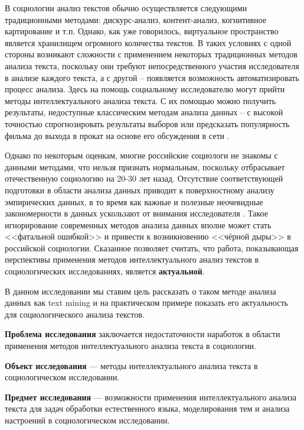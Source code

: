 В социологии анализ текстов обычно осуществляется следующими традиционными методами: дискурс-анализ, контент-анализ, когнитивное картирование и т.п. Однако, как уже говорилось, виртуальное пространство является хранилищем огромного количества текстов. В таких условиях с одной стороны возникают сложности с применением некоторых традиционных методов анализа текста, поскольку они требуют непосредственного участия исследователя в анализе каждого текста, а с другой -- появляется возможность автоматизировать процесс анализа. Здесь на помощь социальному исследователю могут прийти методы интеллектуального анализа текста. С их помощью можно получить результаты, недоступные классическим методам анализа данных --  с высокой точностью спрогнозировать результаты выборов \cite{venezuala} или предсказать популярность фильма до выхода в прокат на основе его обсуждения в сети \cite{hp_predicting}.

Однако по некоторым оценкам, многие российские социологи не знакомы с данными методами, что нельзя признать нормальным, поскольку отбрасывает отечественную социологию на 20-30 лет назад. Отсутствие соответствующей подготовки в области анализа данных приводит к поверхностному анализу эмпирических данных, в то время как важные и полезные неочевидные закономерности в данных ускользают от внимания исследователя \cite{Davydov_Knowledge}. Такое игнорирование современных методов анализа данных вполне может стать <<фатальной ошибкой>> \cite{Davidov_fatal} и привести к возникновению <<чёрной дыры>> \cite{black_hole} в российской социологии. Сказанное позволяет считать, что работа, показывающая перспективы применения методов интеллектуального анализ текстов в социологических исследованиях, является \textbf{актуальной}.

В данном исследовании мы ставим цель рассказать о таком методе анализа данных как text mining и на практическом примере показать его актуальность для социологического анализа текстов.

\textbf{Проблема исследования} заключается недостаточности наработок в области применения методов интеллектуального анализа текста в социологии.

\textbf{Объект исследования} --- методы интеллектуального анализа текста в социологическом исследовании.

\textbf{Предмет исследования} --- возможности применения интеллектуального анализа текста для задач обработки естественного языка, моделирования тем и анализа настроений в социологическом исследовании.

\clearpage